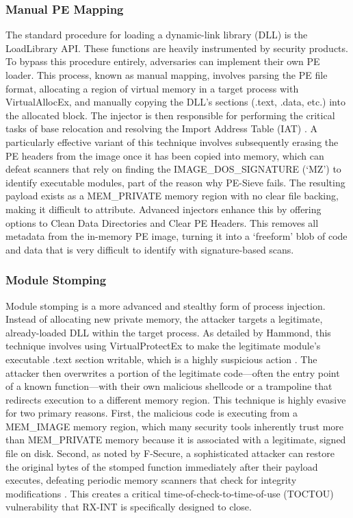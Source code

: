 \documentclass[journal]{IEEEtran}
\begin{document}
\subsubsection{Manual PE Mapping}
The standard procedure for loading a dynamic-link library (DLL) is the LoadLibrary API. These functions are heavily instrumented by security products. To bypass this procedure entirely, adversaries can implement their own PE loader. This process, known as manual mapping, involves parsing the PE file format, allocating a region of virtual memory in a target process with VirtualAllocEx, and manually copying the DLL's sections (.text, .data, etc.) into the allocated block. The injector is then responsible for performing the critical tasks of base relocation and resolving the Import Address Table (IAT) \cite{IredTeamModuleStomping}. A particularly effective variant of this technique involves subsequently erasing the PE headers from the image once it has been copied into memory, which can defeat scanners that rely on finding the IMAGE\_DOS\_SIGNATURE (`MZ') to identify executable modules, part of the reason why PE-Sieve fails. The resulting payload exists as a MEM\_PRIVATE memory region with no clear file backing, making it difficult to attribute. Advanced injectors enhance this by offering options to Clean Data Directories and Clear PE Headers. This removes all metadata from the in-memory PE image, turning it into a `freeform' blob of code and data that is very difficult to identify with signature-based scans.
\subsubsection{Module Stomping}
Module stomping is a more advanced and stealthy form of process injection. Instead of allocating new private memory, the attacker targets a legitimate, already-loaded DLL within the target process. As detailed by Hammond, this technique involves using VirtualProtectEx to make the legitimate module's executable .text section writable, which is a highly suspicious action \cite{Orr2019}. The attacker then overwrites a portion of the legitimate code—often the entry point of a known function—with their own malicious shellcode or a trampoline that redirects execution to a different memory region.
This technique is highly evasive for two primary reasons. First, the malicious code is executing from a MEM\_IMAGE memory region, which many security tools inherently trust more than MEM\_PRIVATE memory because it is associated with a legitimate, signed file on disk. Second, as noted by F-Secure, a sophisticated attacker can restore the original bytes of the stomped function immediately after their payload executes, defeating periodic memory scanners that check for integrity modifications \cite{Orr2019}. This creates a critical time-of-check-to-time-of-use (TOCTOU) vulnerability that RX-INT is specifically designed to close.
\end{document}
